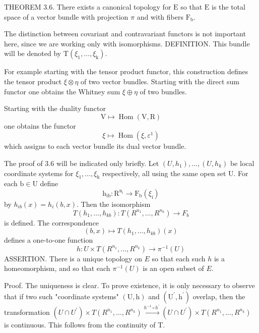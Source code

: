 \documentclass[10pt]{article}
\begin{document}
THEOREM 3.6. There exists a canonical topology for $\mathrm{E}$ so that $\mathrm{E}$ is the total space of a vector bundle with projection $\pi$ and with fibers $\mathrm{F}_{\mathrm{b}}$.

The distinction between covariant and contravariant functors is not important here, since we are working only with isomorphisms. DEFINITION. This bundle will be denoted by $\mathrm{T}\left(\xi_{1}, \ldots, \xi_{\mathrm{k}}\right)$.

For example starting with the tensor product functor, this construction defines the tensor product $\xi \otimes \eta$ of two vector bundles. Starting with the direct sum functor one obtains the Whitney sum $\xi \oplus \eta$ of two bundles.

Starting with the duality functor
$$
\mathrm{V} \mapsto \operatorname{Hom}(\mathrm{V}, \mathrm{R})
$$
one obtains the functor
$$
\xi \mapsto \operatorname{Hom}\left(\xi, \varepsilon^{1}\right)
$$
which assigns to each vector bundle its dual vector bundle.

The proof of $3.6$ will be indicated only briefly. Let $\left(U, h_{1}\right), \ldots,\left(U, h_{k}\right)$ be local coordinate systems for $\xi_{1}, \ldots, \xi_{\mathrm{k}}$ respectively, all using the same open set $\mathrm{U}$. For each $\mathrm{b} \in \mathrm{U}$ define
$$
\mathrm{h}_{\mathrm{ib}}: \mathrm{R}^{\mathrm{n}_{\mathrm{i}}} \rightarrow \mathrm{F}_{\mathrm{b}}\left(\xi_{\mathrm{i}}\right)
$$
by $h_{i b}(x)=h_{i}(b, x)$. Then the isomorphism
$$
T\left(h_{1}, \ldots, h_{k b}\right): T\left(R^{n_{1}}, \ldots, R^{n_{k}}\right) \rightarrow F_{b}
$$
is defined. The correspondence
$$
(b, x) \mapsto T\left(h_{1}, \ldots, h_{k b}\right)(x)
$$
defines a one-to-one function
$$
h: U \times T\left(R^{n_{1}}, \ldots, R^{n_{k}}\right) \rightarrow \pi^{-1}(U)
$$
ASSERTION. There is a unique topology on $E$ so that each such $h$ is a homeomorphism, and so that each $\pi^{-1}(U)$ is an open subset of $E$.

Proof. The uniqueness is clear. To prove existence, it is only necessary to observe that if two such "coordinate systems" $(\mathrm{U}, \mathrm{h})$ and $\left(\mathrm{U}^{\prime}, \mathrm{h}^{\prime}\right)$ overlap, then the transformation $\left(U \cap U^{\prime}\right) \times T\left(R^{n_{1}}, \ldots, R^{n_{k}}\right) \stackrel{h^{-1} \circ h^{\prime}}{\longrightarrow}\left(U \cap U^{\prime}\right) \times T\left(R^{n_{1}}, \ldots, R^{n_{k}}\right)$ is continuous. This follows from the continuity of $\mathrm{T}$.
\end{document}
